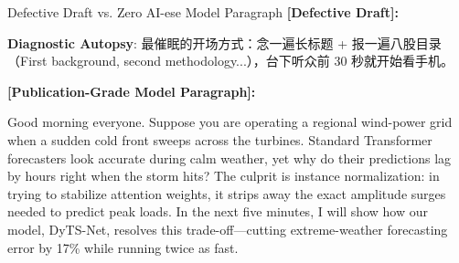 \begin{ExampleBox}{Defective Draft vs. Zero AI-ese Model Paragraph}
\textbf{\color{TargetHighlight}[Defective Draft]:}\par
{}\par\vspace{4pt}
\textbf{Diagnostic Autopsy}: 最催眠的开场方式：念一遍长标题 + 报一遍八股目录（First background, second methodology...），台下听众前 30 秒就开始看手机。\par\vspace{6pt}
\textbf{\color{AcadNavy}[Publication-Grade Model Paragraph]:}\par
Good morning everyone. Suppose you are operating a regional wind-power grid when a sudden cold front sweeps across the turbines. Standard Transformer forecasters look accurate during calm weather, yet why do their predictions lag by hours right when the storm hits? The culprit is instance normalization: in trying to stabilize attention weights, it strips away the exact amplitude surges needed to predict peak loads. In the next five minutes, I will show how our model, DyTS-Net, resolves this trade-off---cutting extreme-weather forecasting error by 17\% while running twice as fast.
\end{ExampleBox}
